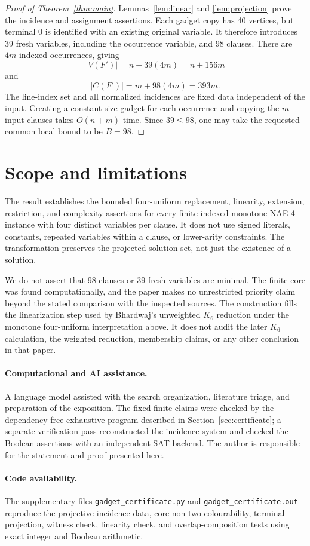 \documentclass[11pt]{article}
\theoremstyle{definition}
\begin{document}
\begin{proof}[Proof of Theorem~\ref{thm:main}]
Lemmas~\ref{lem:linear} and \ref{lem:projection} prove the incidence and
assignment assertions.  Each gadget copy has 40 vertices, but terminal 0 is
identified with an existing original variable.  It therefore introduces 39
fresh variables, including the occurrence variable, and 98 clauses.  There
are $4m$ indexed occurrences, giving
\[
   |V(F')|=n+39(4m)=n+156m
\]
and
\[
   |C(F')|=m+98(4m)=393m.
\]
The line-index set and all normalized incidences are fixed data independent
of the input.  Creating a constant-size gadget for each occurrence and
copying the $m$ input clauses takes $O(n+m)$ time.  Since $39\leq98$, one may
take the requested common local bound to be $B=98$.
\end{proof}

\section{Scope and limitations}

The result establishes the bounded four-uniform replacement, linearity,
extension, restriction, and complexity assertions for every finite indexed
monotone NAE-4 instance with four distinct variables per clause.  It does not
use signed literals, constants, repeated variables within a clause, or
lower-arity constraints.  The transformation preserves the projected
solution set, not just the existence of a solution.

We do not assert that 98 clauses or 39 fresh variables are minimal.  The
finite core was found computationally, and the paper makes no unrestricted
priority claim beyond the stated comparison with the inspected sources.  The
construction fills the linearization step used by Bhardwaj's unweighted
$K_6$ reduction under the monotone four-uniform interpretation above.  It
does not audit the later $K_6$ calculation, the weighted reduction, membership
claims, or any other conclusion in that paper.

\paragraph{Computational and AI assistance.}
A language model assisted with the search organization, literature triage,
and preparation of the exposition.  The fixed finite claims were checked by
the dependency-free exhaustive program described in
Section~\ref{sec:certificate}; a separate verification pass reconstructed the
incidence system and checked the Boolean assertions with an independent SAT
backend.  The author is responsible for the statement and proof presented
here.

\paragraph{Code availability.}
The supplementary files \texttt{gadget\_certificate.py} and
\texttt{gadget\_certificate.out} reproduce the projective incidence data,
core non-two-colourability, terminal projection, witness check, linearity
check, and overlap-composition tests using exact integer and Boolean
arithmetic.



\end{document}

